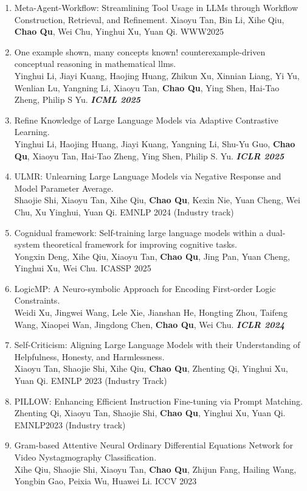 \documentclass{resume}
\begin{document}
\begin{enumerate}
    \item Meta-Agent-Workflow: Streamlining Tool Usage in LLMs through Workflow Construction, Retrieval, and Refinement. Xiaoyu Tan, Bin Li, Xihe Qiu, \textbf{Chao Qu}, Wei Chu, Yinghui Xu, Yuan Qi.  WWW2025

    \item One example shown, many concepts known! counterexample-driven conceptual reasoning in mathematical llms.\\ Yinghui Li, Jiayi Kuang, Haojing Huang, Zhikun Xu, Xinnian Liang, Yi Yu, Wenlian Lu, Yangning Li, Xiaoyu Tan, \textbf{Chao Qu}, Ying Shen, Hai-Tao Zheng, Philip S Yu. \textbf{\textit{ICML 2025}}
    \item Refine Knowledge of Large Language Models via Adaptive Contrastive Learning. \\ Yinghui Li, Haojing Huang, Jiayi Kuang, Yangning Li, Shu-Yu Guo, \textbf{Chao Qu}, Xiaoyu Tan, Hai-Tao Zheng, Ying Shen, Philip S. Yu. \textbf{\textit{ICLR 2025}}
    \item ULMR: Unlearning Large Language Models via Negative Response and Model Parameter Average. \\ Shaojie Shi, Xiaoyu Tan, Xihe Qiu, \textbf{Chao Qu}, Kexin Nie, Yuan Cheng, Wei Chu, Xu Yinghui, Yuan Qi. EMNLP 2024 (Industry track)
    \item Cognidual framework: Self-training large language models within a dual-system theoretical framework for improving cognitive tasks. \\ Yongxin Deng, Xihe Qiu, Xiaoyu Tan, \textbf{Chao Qu}, Jing Pan, Yuan Cheng, Yinghui Xu, Wei Chu. ICASSP 2025
    \item LogicMP: A Neuro-symbolic Approach for Encoding First-order Logic Constraints. \\  Weidi Xu, Jingwei Wang, Lele Xie, Jianshan He, Hongting Zhou, Taifeng Wang, Xiaopei Wan, Jingdong Chen, \textbf{Chao Qu}, Wei Chu. \textbf{\textit{ICLR 2024}}
    \item Self-Criticism: Aligning Large Language Models with their Understanding of Helpfulness, Honesty, and Harmlessness. \\ Xiaoyu Tan, Shaojie Shi, Xihe Qiu, \textbf{Chao Qu}, Zhenting Qi, Yinghui Xu, Yuan Qi. EMNLP 2023 (Industry Track)
    \item PILLOW: Enhancing Efficient Instruction Fine-tuning via Prompt Matching. \\ Zhenting Qi, Xiaoyu Tan, Shaojie Shi, \textbf{Chao Qu}, Yinghui Xu, Yuan Qi. EMNLP2023 (Industry track)
    \item Gram-based Attentive Neural Ordinary Differential Equations Network for Video Nystagmography Classification. \\ Xihe Qiu, Shaojie Shi, Xiaoyu Tan, \textbf{Chao Qu}, Zhijun Fang, Hailing Wang, Yongbin Gao, Peixia Wu, Huawei Li. ICCV 2023

\end{enumerate}
\end{document}
